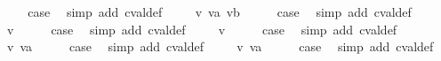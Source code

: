 \begin{isabellebody}
\ \ \isamarkupfalse%
\ \isamarkupfalse%
\ {\isacharquery}case\ \isamarkupfalse%
\ {\isacharparenleft}simp\ add{\isacharcolon}\ cval{\isacharunderscore}def{\isacharparenright}\isanewline
{}\isamarkupfalse%
\isanewline
\ \ \isamarkupfalse%
\ {\isacharparenleft}{\isachardoublequoteopen}{}{\isacharunderscore}{}{}{\isachardoublequoteclose}\ v\ va\ vb{\isacharparenright}\isanewline
\ \ \isamarkupfalse%
\ \isamarkupfalse%
\ {\isacharquery}case\ \isamarkupfalse%
\ {\isacharparenleft}simp\ add{\isacharcolon}\ cval{\isacharunderscore}def{\isacharparenright}\isanewline
{}\isamarkupfalse%
\isanewline
\ \ \isamarkupfalse%
\ {\isacharparenleft}{\isachardoublequoteopen}{}{\isacharunderscore}{}{}{\isachardoublequoteclose}\ v{\isacharparenright}\isanewline
\ \ \isamarkupfalse%
\ \isamarkupfalse%
\ {\isacharquery}case\ \isamarkupfalse%
\ {\isacharparenleft}simp\ add{\isacharcolon}\ cval{\isacharunderscore}def{\isacharparenright}\isanewline
{}\isamarkupfalse%
\isanewline
\ \ \isamarkupfalse%
\ {\isacharparenleft}{\isachardoublequoteopen}{}{\isacharunderscore}{}{}{\isachardoublequoteclose}\ v{\isacharparenright}\isanewline
\ \ \isamarkupfalse%
\ \isamarkupfalse%
\ {\isacharquery}case\ \isamarkupfalse%
\ {\isacharparenleft}simp\ add{\isacharcolon}\ cval{\isacharunderscore}def{\isacharparenright}\isanewline
{}\isamarkupfalse%
\isanewline
\ \ \isamarkupfalse%
\ {\isacharparenleft}{\isachardoublequoteopen}{}{\isacharunderscore}{}{}{\isachardoublequoteclose}\ v\ va{\isacharparenright}\isanewline
\ \ \isamarkupfalse%
\ \isamarkupfalse%
\ {\isacharquery}case\ \isamarkupfalse%
\ {\isacharparenleft}simp\ add{\isacharcolon}\ cval{\isacharunderscore}def{\isacharparenright}\isanewline
{}\isamarkupfalse%
\isanewline
\ \ \isamarkupfalse%
\ {\isacharparenleft}{\isachardoublequoteopen}{}{\isacharunderscore}{}{}{\isachardoublequoteclose}\ v\ va{\isacharparenright}\isanewline
\ \ \isamarkupfalse%
\ \isamarkupfalse%
\ {\isacharquery}case\ \isamarkupfalse%
\ {\isacharparenleft}simp\ add{\isacharcolon}\ cval{\isacharunderscore}def{\isacharparenright}\isanewline

\end{isabellebody}
